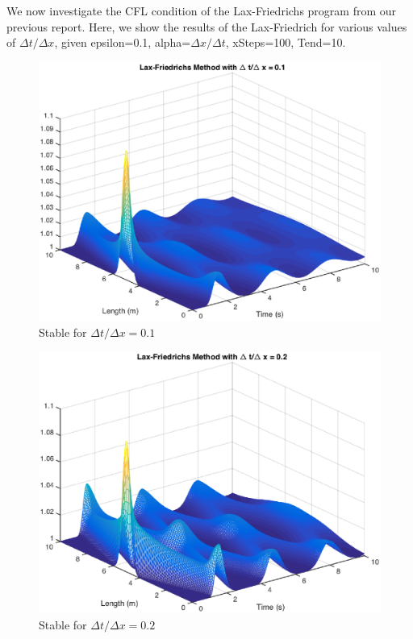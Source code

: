 We now investigate the CFL condition of the Lax-Friedrichs program from our previous report. Here, we show the results of the Lax-Friedrich for various values of $\Delta t/\Delta x$, given epsilon=0.1, alpha=$\Delta x/\Delta t$, xSteps=100, Tend=10. 

\FloatBarrier
\begin{figure}
\begin{center}
\includegraphics[scale=0.6]{lax01.eps}
\caption{Stable for $\Delta t/\Delta x=0.1$}
\label{reg}
\end{center}
\end{figure}

\begin{figure}
\begin{center}
\includegraphics[scale=0.6]{lax02.eps}
\caption{Stable for $\Delta t/\Delta x=0.2$}
\label{reg}
\end{center}
\end{figure}

